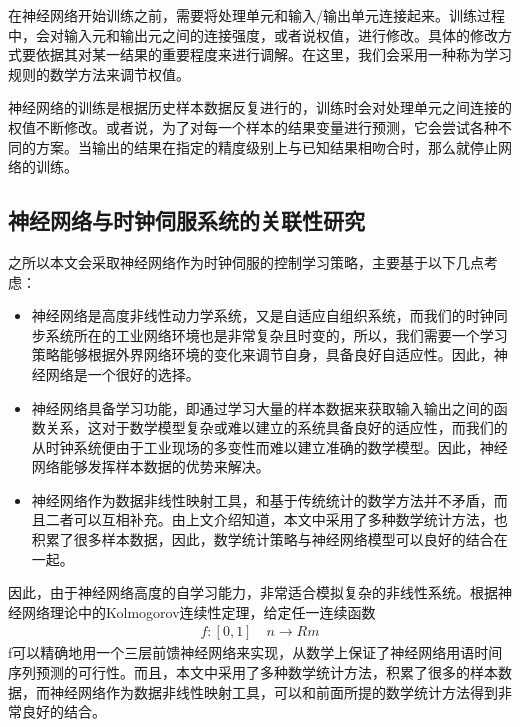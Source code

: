 在神经网络开始训练之前，需要将处理单元和输入/输出单元连接起来。训练过程中，会对输入元和输出元之间的连接强度，或者说权值，进行修改。具体的修改方式要依据其对某一结果的重要程度来进行调解。在这里，我们会采用一种称为学习规则的数学方法来调节权值。

神经网络的训练是根据历史样本数据反复进行的，训练时会对处理单元之间连接的权值不断修改。或者说，为了对每一个样本的结果变量进行预测，它会尝试各种不同的方案。当输出的结果在指定的精度级别上与已知结果相吻合时，那么就停止网络的训练。

\subsection{神经网络与时钟伺服系统的关联性研究}
之所以本文会采取神经网络作为时钟伺服的控制学习策略，主要基于以下几点考虑：
\begin{itemize}[noitemsep,topsep=0pt,parsep=0pt,partopsep=0pt]
	\item 神经网络是高度非线性动力学系统，又是自适应自组织系统，而我们的时钟同步系统所在的工业网络环境也是非常复杂且时变的，所以，我们需要一个学习策略能够根据外界网络环境的变化来调节自身，具备良好自适应性。因此，神经网络是一个很好的选择。
	\item 神经网络具备学习功能，即通过学习大量的样本数据来获取输入输出之间的函数关系，这对于数学模型复杂或难以建立的系统具备良好的适应性，而我们的从时钟系统便由于工业现场的多变性而难以建立准确的数学模型。因此，神经网络能够发挥样本数据的优势来解决。
	\item 神经网络作为数据非线性映射工具，和基于传统统计的数学方法并不矛盾，而且二者可以互相补充。由上文介绍知道，本文中采用了多种数学统计方法，也积累了很多样本数据，因此，数学统计策略与神经网络模型可以良好的结合在一起。
\end{itemize}

因此，由于神经网络高度的自学习能力，非常适合模拟复杂的非线性系统。根据神经网络理论中的Kolmogorov连续性定理，给定任一连续函数
\begin{align}
f:[0,1] \quad n \rightarrow Rm
\end{align}
f可以精确地用一个三层前馈神经网络来实现，从数学上保证了神经网络用语时间序列预测的可行性。而且，本文中采用了多种数学统计方法，积累了很多的样本数据，而神经网络作为数据非线性映射工具，可以和前面所提的数学统计方法得到非常良好的结合。

